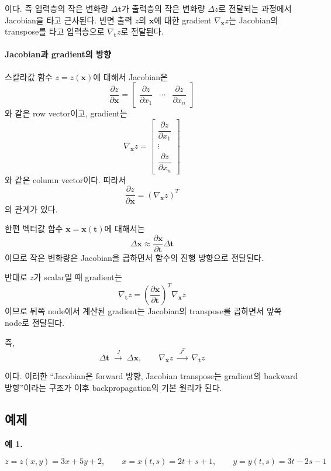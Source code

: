 \documentclass[11pt,a4paper]{article}
\begin{document}
이다. 즉 입력층의 작은 변화량 $\Delta\mathbf t$가 출력층의 작은 변화량 $\Delta z$로 전달되는 과정에서 Jacobian을 타고 근사된다.
반면 출력 $z$의 $\mathbf x$에 대한 gradient $\nabla_{\mathbf x}z$는 Jacobian의 transpose를 타고 입력층으로 $\nabla_{\mathbf t} z$로 전달된다.
\paragraph{Jacobian과 gradient의 방향}

스칼라값 함수 $z=z(\mathbf x)$에 대해서 Jacobian은
\[
\frac{\partial z}{\partial\mathbf x}
=
\begin{bmatrix}
\dfrac{\partial z}{\partial x_1}
&
\cdots
&
\dfrac{\partial z}{\partial x_n}
\end{bmatrix}
\]
와 같은 row vector이고, gradient는
\[
\nabla_{\mathbf x}z
=
\begin{bmatrix}
\dfrac{\partial z}{\partial x_1}\\
\vdots\\
\dfrac{\partial z}{\partial x_n}
\end{bmatrix}
\]
와 같은 column vector이다. 따라서
\[
\boxed{
\frac{\partial z}{\partial\mathbf x}
=
(\nabla_{\mathbf x}z)^T
}
\]
의 관계가 있다.

한편 벡터값 함수 $\mathbf x=\mathbf x(\mathbf t)$에 대해서는
\[
\Delta\mathbf x
\approx
\frac{\partial\mathbf x}{\partial\mathbf t}
\Delta\mathbf t
\]
이므로 작은 변화량은 Jacobian을 곱하면서 함수의 진행 방향으로 전달된다.

반대로 $z$가 scalar일 때 gradient는
\[
\boxed{
\nabla_{\mathbf t}z
=
\left(
\frac{\partial\mathbf x}{\partial\mathbf t}
\right)^T
\nabla_{\mathbf x}z
}
\]
이므로 뒤쪽 node에서 계산된 gradient는 Jacobian의 transpose를
곱하면서 앞쪽 node로 전달된다.

즉,
\[
\boxed{
\Delta\mathbf t
\;\xrightarrow{\;J\;}\;
\Delta\mathbf x,
\qquad
\nabla_{\mathbf x}z
\;\xrightarrow{\;J^T\;}\;
\nabla_{\mathbf t}z
}
\]

이다. 이러한 ``Jacobian은 forward 방향, Jacobian transpose는
gradient의 backward 방향''이라는 구조가 이후
backpropagation의 기본 원리가 된다.
\subsection*{예제}


\textbf{예 1.}

\[
z=z(x,y)=3x+5y+2,
\qquad
x=x(t,s)=2t+s+1,
\qquad
y=y(t,s)=3t-2s-1
\]
\end{document}
